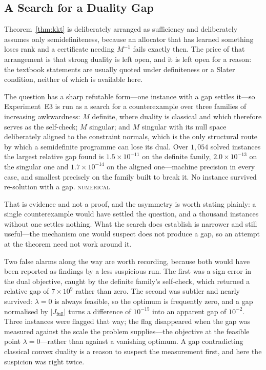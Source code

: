 \documentclass[conference]{IEEEtran}
\theoremstyle{definition}
\newcommand{\NUM}{\textsc{numerical}}
\begin{document}
\subsection{A Search for a Duality Gap}
\label{sec:e3results}

Theorem~\ref{thm:kkt} is deliberately arranged as sufficiency and deliberately assumes only
semidefiniteness, because an allocator that has learned something loses rank and a certificate
needing $M^{-1}$ fails exactly then. The price of that arrangement is that strong duality is
left open, and it is left open for a reason: the textbook statements are usually quoted under
definiteness or a Slater condition, neither of which is available here.

The question has a sharp refutable form---one instance with a gap settles it---so
Experiment~E3 is run as a search for a counterexample over three families of increasing
awkwardness: $M$ definite, where duality is classical and which therefore serves as the
self-check; $M$ singular; and $M$ singular with its null space deliberately aligned to the
constraint normals, which is the only structural route by which a semidefinite programme can
lose its dual. Over $1{,}054$ solved instances the largest relative gap found is
$1.5\times10^{-11}$ on the definite family, $2.0\times10^{-13}$ on the singular one and
$1.7\times10^{-14}$ on the aligned one---machine precision in every case, and smallest
precisely on the family built to break it. No instance survived re-solution with a gap.
\NUM{}

That is evidence and not a proof, and the asymmetry is worth stating plainly: a single
counterexample would have settled the question, and a thousand instances without one settles
nothing. What the search does establish is narrower and still useful---the mechanism one would
suspect does not produce a gap, so an attempt at the theorem need not work around it.

Two false alarms along the way are worth recording, because both would have been reported as
findings by a less suspicious run. The first was a sign error in the dual objective, caught by
the definite family's self-check, which returned a relative gap of $7\times10^{9}$ rather than
zero. The second was subtler and nearly survived: $\lambda=0$ is always feasible, so the
optimum is frequently zero, and a gap normalised by $|J_{\mathrm{full}}|$ turns a difference of
$10^{-15}$ into an apparent gap of $10^{-2}$. Three instances were flagged that way; the flag
disappeared when the gap was measured against the scale the problem supplies---the objective at
the feasible point $\lambda=0$---rather than against a vanishing optimum. A gap contradicting
classical convex duality is a reason to suspect the measurement first, and here the suspicion
was right twice.
\end{document}
